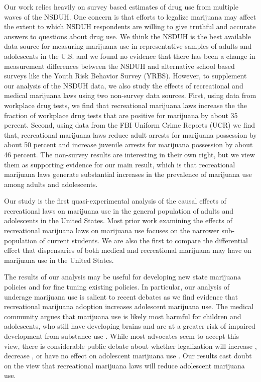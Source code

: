 \documentclass[12pt]{article}%
\begin{document}
Our work relies heavily on survey based estimates of drug use from multiple waves of the NSDUH. One concern is that efforts to legalize marijuana may affect the extent to which NSDUH respondents are willing to give truthful and accurate answers to questions about drug use. We think the NSDUH is the best available data source for measuring marijuana use in representative samples of adults and adolescents in the U.S. and we found no evidence that there has been a change in measurement differences between the NSDUH and alternative school based surveys like the Youth Risk Behavior Survey (YRBS). However, to supplement our analysis of the NSDUH data, we also study the effects of recreational and medical marijuana laws using two non-survey data sources. First, using data from workplace drug tests, we find that recreational marijuana laws increase the the fraction of workplace drug tests that are positive for marijuana by about 35 percent. Second, using data from the FBI Uniform Crime Reports (UCR) we find that, recreational marijuana laws reduce adult arrests for marijuana possession by about 50 percent and increase juvenile arrests for marijuana possession by about 46 percent.  The non-survey results are interesting in their own right, but we view them as supporting evidence for our main result, which is that recreational marijuana laws generate substantial increases in the prevalence of marijuana use among adults and adolescents. 

Our study is the first quasi-experimental analysis of the causal effects of recreational laws on marijuana use in the general population of adults and adolescents in the United States. Most prior work examining the effects of recreational marijuana laws on marijuana use focuses on the narrower sub-population of current students. We are also the first to compare the differential effect that dispensaries of both medical and recreational marijuana may have on marijuana use in the United States.

The results of our analysis may be useful for developing new state marijuana policies and for fine tuning existing policies. In particular, our analysis of underage marijuana use is salient to recent debates as we find evidence that recreational marijuana adoption increases adolescent marijuana use. The medical community argues that marijuana use is likely most harmful for children and adolescents, who still have developing brains and are at a greater risk of impaired development from substance use \citep{AmericanAcademyofPediatrics2015}. While most advocates seem to accept this view, there is considerable public debate about whether legalization will increase \citep{MacleanMJUse2021,cerda2020association, Dudek2019}, decrease  \citep{Blumenfeld2019, Sepeda-Miller2019, Anderson2019}, or have no effect on adolescent marijuana use \citep{Anderson2015,Sarvet2018}. Our results cast doubt on the view that recreational marijuana laws will reduce adolescent marijuana use.
\end{document}
